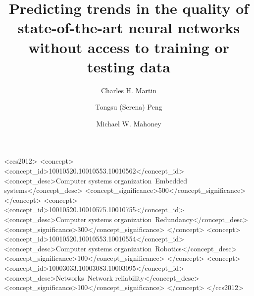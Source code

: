 \documentclass[sigconf]{acmart}
\begin{document}
\title{%
Predicting trends in the quality of state-of-the-art neural networks without access to training or testing data
}


\author{Charles H. Martin}

\author{Tongsu (Serena) Peng}

\author{Michael W. Mahoney}


\begin{abstract}

\end{abstract}

\begin{CCSXML}
<ccs2012>
 <concept>
  <concept_id>10010520.10010553.10010562</concept_id>
  <concept_desc>Computer systems organization~Embedded systems</concept_desc>
  <concept_significance>500</concept_significance>
 </concept>
 <concept>
  <concept_id>10010520.10010575.10010755</concept_id>
  <concept_desc>Computer systems organization~Redundancy</concept_desc>
  <concept_significance>300</concept_significance>
 </concept>
 <concept>
  <concept_id>10010520.10010553.10010554</concept_id>
  <concept_desc>Computer systems organization~Robotics</concept_desc>
  <concept_significance>100</concept_significance>
 </concept>
 <concept>
  <concept_id>10003033.10003083.10003095</concept_id>
  <concept_desc>Networks~Network reliability</concept_desc>
  <concept_significance>100</concept_significance>
 </concept>
</ccs2012>
\end{CCSXML}
\end{document}
